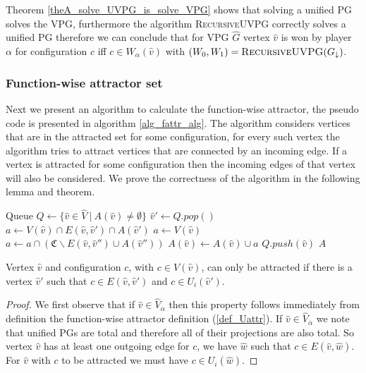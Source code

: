 Theorem \ref{theA_solve_UVPG_is_solve_VPG} shows that solving a unified PG solves the VPG, furthermore the algorithm \textsc{RecursiveUVPG} correctly solves a unified PG therefore we can conclude that for VPG $\hat{G}$ vertex $\hat{v}$ is won by player $\alpha$ for configuration $c$ iff $c \in W_\alpha(\hat{v})$ with $(W_0,W_1) = \textsc{RecursiveUVPG}(G_{\downarrow})$.

\subsubsection{Function-wise attractor set}
Next we present an algorithm to calculate the function-wise attractor, the pseudo code is presented in algorithm \ref{alg_fattr_alg}. The algorithm considers vertices that are in the attracted set for some configuration, for every such vertex the algorithm tries to attract vertices that are connected by an incoming edge. If a vertex is attracted for some configuration then the incoming edges of that vertex will also be considered. We prove the correctness of the algorithm in the following lemma and theorem.
\begin{algorithm}
	\caption{$\textsc{$\alpha$-FAttractor}(G, A : \hat{V} \rightarrow 2^\mathfrak{C})$}\label{alg_fattr_alg}
	\begin{algorithmic}[1]
		\State Queue $Q \gets \{\hat{v} \in \hat{V} \ |\ A(\hat{v}) \neq \emptyset  \}$
		\State $\hat{v}' \gets Q.pop()$
				\State $a \gets V(\hat{v}) \cap E(\hat{v},\hat{v}') \cap A(\hat{v}')$
			\Else
				\State $a \gets V(\hat{v})$
					\State $a \gets a \cap (\mathfrak{C}\backslash E(\hat{v},\hat{v}'') \cup A(\hat{v}''))$
				\EndFor
			\EndIf
				\State $A(\hat{v}) \gets A(\hat{v}) \cup a$
				\State $Q.push(\hat{v})$
			\EndIf
		\EndFor
		\EndWhile
		\State \Return $A$
	\end{algorithmic}
\end{algorithm}
\begin{lemma}
\label{lem_attr_requires_E}
Vertex $\hat{v}$ and configuration $c$, with $c \in V(\hat{v})$, can only be attracted if there is a vertex $\hat{v}'$ such that $c \in E(\hat{v}, \hat{v}')$ and $c \in U_i(\hat{v}')$.
	\begin{proof}
		We first observe that if $\hat{v} \in \hat{V}_\alpha$ then this property follows immediately from definition the function-wise attractor definition (\ref{def_Uattr}). If $\hat{v} \in \hat{V}_{\overline{\alpha}}$ we note that unified PGs are total and therefore all of their projections are also total. So vertex $\hat{v}$ has at least one outgoing edge for $c$, we have $\hat{w}$ such that $c \in E(\hat{v},\hat{w})$. For $\hat{v}$ with $c$ to be attracted we must have $c \in U_i(\hat{w})$.
	\end{proof}
\end{lemma}
